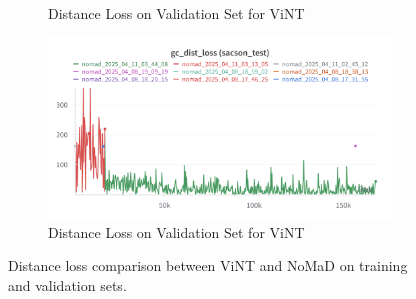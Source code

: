 \documentclass[12pt]{article}
\begin{document}
\begin{figure}[H]
\begin{subfigure}[b]{0.48\textwidth}
        \caption{Distance Loss on Validation Set for ViNT}
        \label{fig:gc_dist_loss_val}
    \end{subfigure}
    \hfill
    \begin{subfigure}[b]{0.48\textwidth}
        \centering
        \includegraphics[width=\textwidth]{images/gc_dist_loss_test.png}
        \caption{Distance Loss on Validation Set for ViNT}
        \label{fig:gc_dist_loss_val_vint}
    \end{subfigure}
    \caption{Distance loss comparison between ViNT and NoMaD on training and validation sets.}
\end{figure}
\end{document}
